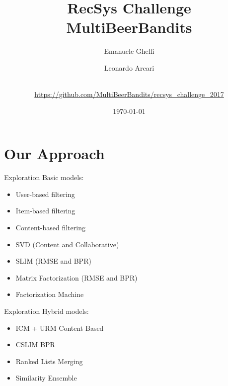 \documentclass{beamer}
\title{ 
 RecSys Challenge \\ MultiBeerBandits
}
\date{\today}
\author{Emanuele Ghelfi \and Leonardo Arcari \and \\ \url{https://github.com/MultiBeerBandits/recsys_challenge_2017}}
\institute{Politecnico di Milano}
\begin{document}
  \maketitle
  \section{Our Approach}
  \begin{frame}{Exploration}
    Basic models:
    		\begin{itemize}
    		\item User-based filtering
    		\item Item-based filtering
    		\item Content-based filtering
    		\item SVD (Content and Collaborative)
    		\item SLIM (RMSE and BPR)
    		\item Matrix Factorization (RMSE and BPR)
    		\item Factorization Machine
		\end{itemize}     
  \end{frame}
  \begin{frame}{Exploration}
    Hybrid models:
    		\begin{itemize}
    		\item ICM + URM Content Based
    		\item CSLIM BPR
    		\item Ranked Lists Merging
    		\item Similarity Ensemble
		\end{itemize}     
  \end{frame}
\end{document}
